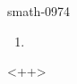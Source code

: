 
\begin{corrige}{smath-0974}

    \begin{enumerate}
        \item
            
    \end{enumerate}
    <++>

\end{corrige}
